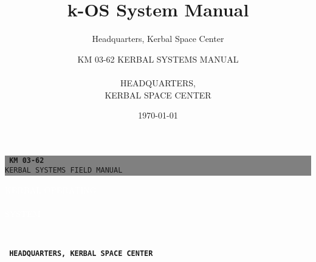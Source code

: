 \documentclass[letterpaper, twoside, 10pt]{report}
\title{k-OS System Manual}
\author{Headquarters, Kerbal Space Center}
\date{\today}
\author{%
    KM 03-62
    KERBAL SYSTEMS MANUAL \\
    \vspace{40pt} \\
    HEADQUARTERS,\\
    KERBAL SPACE CENTER\\
    }
\begin{document}
\begin{titlepage}
\BgThispage
{}
\begin{center}
		\colorbox{gray}{\begin{minipage}{7in}
		\begin{flushright}
		\texttt{\LARGE{\textbf{ KM\,03-62}}}\\
		\texttt{\large KERBAL SYSTEMS FIELD MANUAL}
		\end{flushright}
		\end{minipage}}
	\end{center}
\noindent
\textcolor{white}{\bigsf KERBAL OPERATING\\
				\vspace{8pt} \\
				 SYSTEM}
\vspace*{2.5cm}\par
\noindent
\vspace{300pt} \\
\begin{center}
\texttt{\LARGE{\textbf{ HEADQUARTERS, KERBAL SPACE CENTER}}}
\end{center}
\end{titlepage}
\restoregeometry
\lipsum[1-2]



\tableofcontents











\end{document}
